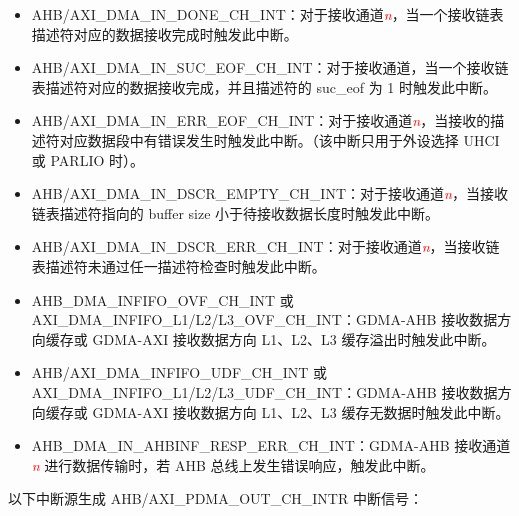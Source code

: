 \documentclass[main\_\_CN.tex]{subfiles}
\begin{document}
\begin{itemize}
    \item \label{int:GDMAINDONEINT}AHB/AXI\_DMA\_IN\_DONE\_CH\_INT：对于接收通道\textcolor{red}{\it{n}}，当一个接收链表描述符对应的数据接收完成时触发此中断。
    \item \label{int:GDMAINSUCEOFINT}AHB/AXI\_DMA\_IN\_SUC\_EOF\_CH\_INT：对于接收通道，当一个接收链表描述符对应的数据接收完成，并且描述符的 suc\_eof 为 1 时触发此中断。
    \item \label{int:GDMAINERREOFINT}AHB/AXI\_DMA\_IN\_ERR\_EOF\_CH\_INT：对于接收通道\textcolor{red}{\it{n}}，当接收的描述符对应数据段中有错误发生时触发此中断。（该中断只用于外设选择 UHCI 或 PARLIO 时）。
    \item \label{int:GDMAINDSCREMPTYINT}AHB/AXI\_DMA\_IN\_DSCR\_EMPTY\_CH\_INT：对于接收通道\textcolor{red}{\it{n}}，当接收链表描述符指向的 buffer size 小于待接收数据长度时触发此中断。
    \item \label{int:GDMAINDSCRERRINT}AHB/AXI\_DMA\_IN\_DSCR\_ERR\_CH\_INT：对于接收通道\textcolor{red}{\it{n}}，当接收链表描述符未通过任一描述符检查时触发此中断。
    \item \label{int:GDMAINFIFOOVFINT} AHB\_DMA\_INFIFO\_OVF\_CH\_INT 或 AXI\_DMA\_INFIFO\_L1/L2/L3\_OVF\_CH\_INT：GDMA-AHB 接收数据方向缓存或 GDMA-AXI 接收数据方向 L1、L2、L3 缓存溢出时触发此中断。
    \item \label{int:GDMAINFIFOUDFINT}AHB/AXI\_DMA\_INFIFO\_UDF\_CH\_INT 或 AXI\_DMA\_INFIFO\_L1/L2/L3\_UDF\_CH\_INT：GDMA-AHB 接收数据方向缓存或 GDMA-AXI 接收数据方向 L1、L2、L3 缓存无数据时触发此中断。
    \item \label{int:GDMAINAHBINFRESPERRINT}AHB\_DMA\_IN\_AHBINF\_RESP\_ERR\_CH\_INT：GDMA-AHB 接收通道\textcolor{red}{\it{n}} 进行数据传输时，若 AHB 总线上发生错误响应，触发此中断。
\end{itemize}

以下中断源生成 AHB/AXI\_PDMA\_OUT\_CH\_INTR 中断信号：
\end{document}
